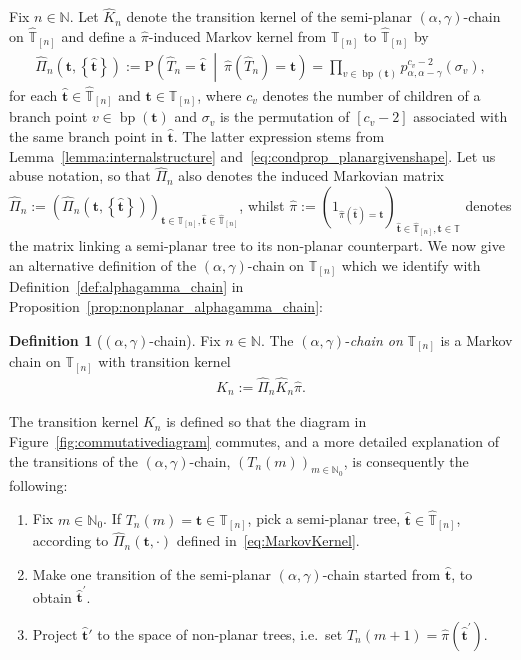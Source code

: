 \documentclass[a4paper, final]{amsart}
\theoremstyle{plain}
\theoremstyle{definition}
\newtheorem{defi}[thm]{Definition}
\newcommand{\tree}[1][t]{\boldsymbol{#1}}
\newcommand{\that}[1][t]{\hat{\boldsymbol{#1}}} %
\newcommand{\That}[1][T]{\widehat{#1}}
\newcommand{\Thatspace}[1][\T]{\widehat{\boldsymbol{#1}}} %
\newcommand{\T}{\mathbb{T}}
\DeclareMathOperator{\branchpoints}{bp}
\newcommand{\nin}{{n \in \mathbb{N}}}
\renewcommand{\P}{\mathrm{P}}
\newcommand{\N}{\mathbb{N}}
\begin{document}
Fix $\nin$.
Let $\hat{K}_n$ denote the transition kernel of the semi-planar $(\alpha, \gamma)$-chain on $\Thatspace_{[n]}$ and define a $\hat{\pi}$-induced Markov kernel from $\T_{[n]}$ to $\Thatspace_{[n]}$ by
%
\begin{align}
  \hat{\Pi}_n \left( \tree, \left\{ \that \right\} \right)
  := \P \left( \That_n = \that \ \middle \vert \ \hat{\pi} \left( \That_n \right) = \tree \right)
  = \prod_{v \in \branchpoints(\tree)} p^{c_v-2}_{\alpha, \alpha - \gamma} \left( \sigma_v \right),
  \label{eq:MarkovKernel}
\end{align}
%
for each $\that \in \Thatspace_{[n]}$ and $\tree \in \T_{[n]}$, where $c_v$ denotes the number of children of a branch point $v \in \branchpoints (\tree)$ and $\sigma_v$ is the permutation of $[c_v - 2]$ associated with the same branch point in $\that$.
The latter expression stems from Lemma~\ref{lemma:internalstructure} and~\eqref{eq:condprop_planargivenshape}.
Let us abuse notation, so that $\hat{\Pi}_n$ also denotes the induced Markovian matrix $\hat{\Pi}_n := {\left( \hat{\Pi}_n \left( \tree, \left\{ \that \right\} \right) \right)}_{\tree \in \T_{[n]}, \that \in \Thatspace_{[n]}}$, whilst $\hat{\pi} := {\left( 1_{\hat{\pi}(\that) = \tree} \right)}_{\that \in \Thatspace_{[n]}, \tree \in \T}$ denotes the matrix linking a semi-planar tree to its non-planar counterpart.
We now give an alternative definition of the $(\alpha, \gamma)$-chain on $\T_{[n]}$ which we identify with Definition~\ref{def:alphagamma_chain} in Proposition~\ref{prop:nonplanar_alphagamma_chain}:
%
\begin{defi}[$(\alpha, \gamma)$-chain]
  \label{def:alpha_gamma_chain}
  Fix $\nin$.
  The $(\alpha, \gamma)$-\textit{chain on} $\T_{[n]}$ is a Markov chain on $\T_{[n]}$ with transition kernel
%
  \begin{align}\label{eq:nonplanartransitionmatrix}
    K_n := \hat{\Pi}_n \hat{K}_n \hat{\pi}.
  \end{align}
%
\end{defi}
%
The transition kernel $K_n$ is defined so that the diagram in Figure~\ref{fig:commutativediagram} commutes, and a more detailed explanation of the transitions of the $(\alpha, \gamma)$-chain, ${\left( T_n(m) \right)}_{m \in \N_0}$, is consequently the following:
%
\begin{enumerate}
  \item Fix $m \in \N_0$.
    If $T_n(m) = \tree \in \T_{[n]}$, pick a semi-planar tree, $\that \in \Thatspace_{[n]}$, according to $\hat{\Pi}_n \left( \tree, \cdot \right)$ defined in~\eqref{eq:MarkovKernel}.
  \item Make one transition of the semi-planar $(\alpha, \gamma)$-chain started from $\that$, to obtain $\that^\prime$.
  \item Project $\that'$ to the space of non-planar trees, i.e.\ set $T_n(m+1) = \hat{\pi} (\that^\prime)$.
\end{enumerate}
\end{document}
